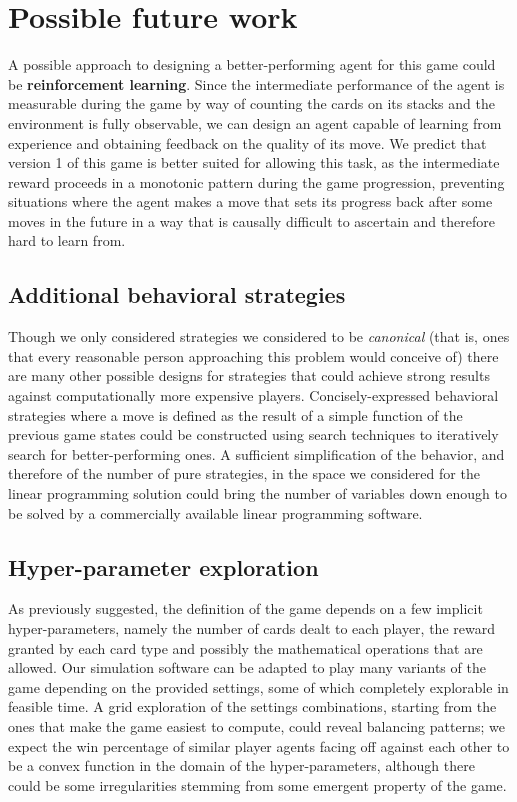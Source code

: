 \documentclass[conference]{IEEEtran}
\begin{document}
\section{Possible future work}
A possible approach to designing a better-performing agent for this game could be \textbf{reinforcement learning}. Since the intermediate performance of the agent is measurable during the game by way of counting the cards on its stacks and the environment is fully observable, we can design an agent capable of learning from experience and obtaining feedback on the quality of its move. We predict that version 1 of this game is better suited for allowing this task, as the intermediate reward proceeds in a monotonic pattern during the game progression, preventing situations where the agent makes a move that sets its progress back after some moves in the future in a way that is causally difficult to ascertain and therefore hard to learn from.

\subsection{Additional behavioral strategies}
Though we only considered strategies we considered to be \textit{canonical} (that is, ones that every reasonable person approaching this problem would conceive of) there are many other possible designs for strategies that could achieve strong results against computationally more expensive players. Concisely-expressed behavioral strategies where a move is defined as the result of a simple function of the previous game states could be constructed using search techniques to iteratively search for better-performing ones. A sufficient simplification of the behavior, and therefore of the number of pure strategies, in the space we considered for the linear programming solution could bring the number of variables down enough to be solved by a commercially available linear programming software.

\subsection{Hyper-parameter exploration}
As previously suggested, the definition of the game depends on a few implicit hyper-parameters, namely the number of cards dealt to each player, the reward granted by each card type and possibly the mathematical operations that are allowed. Our simulation software can be adapted to play many variants of the game depending on the provided settings, some of which completely explorable in feasible time. A grid exploration of the settings combinations, starting from the ones that make the game easiest to compute, could reveal balancing patterns; we expect the win percentage of similar player agents facing off against each other to be a convex function in the domain of the hyper-parameters, although there could be some irregularities stemming from some emergent property of the game.
\end{document}
